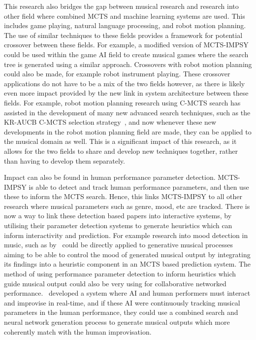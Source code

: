 This research also bridges the gap between musical research and research into other field where combined MCTS and machine learning systems are used. This includes game playing, natural language processing, and robot motion planning. The use of similar techniques to these fields provides a framework for potential crossover between these fields. For example, a modified version of MCTS-IMPSY could be used within the game AI field to create musical games where the search tree is generated using a similar approach. Crossovers with robot motion planning could also be made, for example robot instrument playing. These crossover applications do not have to be a mix of the two fields however, as there is likely even more impact provided by the new link in system architecture between these fields. For example, robot motion planning research using C-MCTS search has assisted in the development of many new advanced search techniques, such as the KR-AUCB C-MCTS selection strategy~\citep{Lei2021KBTree}, and now whenever these new developments in the robot motion planning field are made, they can be applied to the musical domain as well. This is a significant impact of this research, as it allows for the two fields to share and develop new techniques together, rather than having to develop them separately.

Impact can also be found in human performance parameter detection. MCTS-IMPSY is able to detect and track human performance parameters, and then use these to inform the MCTS search. Hence, this links MCTS-IMPSY to all other research where musical parameters such as genre, mood, etc are tracked. There is now a way to link these detection based papers into interactive systems, by utilising their parameter detection systems to generate heuristics which can inform interactivity and prediction. For example research into mood detection in music, such as by~\cite{Lu2006MoodDetection} could be directly applied to generative musical processes aiming to be able to control the mood of generated musical output by integrating its findings into a heuristic component in an MCTS based prediction system. The method of using performance parameter detection to inform heuristics which guide musical output could also be very using for collaborative networked performance.~\cite{Weinberg2018MultiHumanRobot} developed a system where AI and human performers must interact and improvise in real-time, and if these AI were continuously tracking musical parameters in the human performance, they could use a combined search and neural network generation process to generate musical outputs which more coherently match with the human improvisation.

